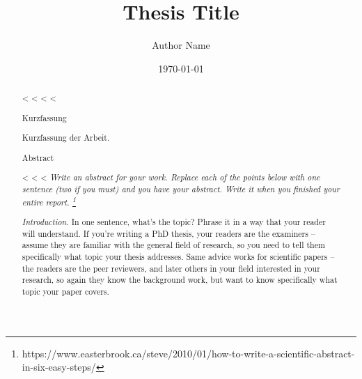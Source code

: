 {{\begin{abstract}
\begin{abstract}
\begin{abstract}
<%
<%
\frontmatter
<%
<%
\title{Thesis Title}
\author{Author Name}
\date{\today}
\maketitle

\pagestyle{scrheadings}

\chapter*{Kurzfassung}
\begin{otherlanguage}{ngerman}
  Kurzfassung der Arbeit.
\end{otherlanguage}
\clearpage

\chapter*{Abstract}
<%
<%
<%
\emph{Write an abstract for your work.
  Replace each of the points below with one sentence (two if you must) and you have your abstract.
  Write it when you finished your entire report.%
  \footnote{https://www.easterbrook.ca/steve/2010/01/how-to-write-a-scientific-abstract-in-six-easy-steps/}}

\emph{Introduction.}
In one sentence, what’s the topic?
Phrase it in a way that your reader will understand.
If you’re writing a PhD thesis, your readers are the examiners – assume they are familiar with the general field of research, so you need to tell them specifically what topic your thesis addresses.
Same advice works for scientific papers – the readers are the peer reviewers, and later others in your field interested in your research, so again they know the background work, but want to know specifically what topic your paper covers.


\end{abstract}
\end{abstract}
\end{abstract}}}
